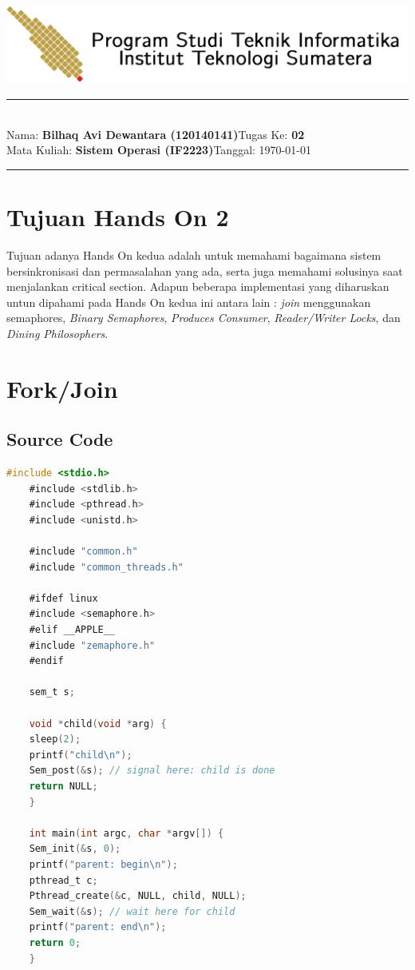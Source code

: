 \documentclass[11pt,a4paper]{article}
\newcommand{\stuid}{120140141}
\newcommand{\student}{\textbf{Bilhaq Avi Dewantara (\stuid{})}}
\newcommand{\course}{\textbf{Sistem Operasi (IF2223)}}
\newcommand{\assignment}{\textbf{02}} %
\begin{document}
\thispagestyle{empty}
\begin{center}
	\includegraphics[scale = 0.15]{Figure1/ifitera-header.png}
	\vspace{0.1cm}
\end{center}
\noindent
{\large
\rule{17cm}{0.2cm}\\[0.3cm]
Nama: \student \hfill Tugas Ke: \assignment\\[0.1cm]
Mata Kuliah: \course \hfill Tanggal: \today\\
\rule{17cm}{0.05cm}
\vspace{0.1cm}
}


\section{Tujuan Hands On 2}
    Tujuan adanya Hands On kedua adalah untuk memahami bagaimana sistem bersinkronisasi dan permasalahan yang ada, serta juga memahami solusinya saat menjalankan critical section.
	Adapun beberapa implementasi yang diharuskan untun dipahami pada Hands On kedua ini antara lain : \textit{join} menggunakan semaphores, \textit{Binary Semaphores}, 
	\textit{Produces Consumer}, \textit{Reader/Writer Locks}, dan \textit{Dining Philosophers}.


\section{Fork/Join}
\subsection{Source Code}
\begin{lstlisting}[language=C]
	#include <stdio.h>
	#include <stdlib.h>
	#include <pthread.h>
	#include <unistd.h>

	#include "common.h"
	#include "common_threads.h"

	#ifdef linux
	#include <semaphore.h>
	#elif __APPLE__
	#include "zemaphore.h"
	#endif

	sem_t s;

	void *child(void *arg) {
	sleep(2);
	printf("child\n");
	Sem_post(&s); // signal here: child is done
	return NULL;
	}

	int main(int argc, char *argv[]) {
	Sem_init(&s, 0); 
	printf("parent: begin\n");
	pthread_t c;
	Pthread_create(&c, NULL, child, NULL);
	Sem_wait(&s); // wait here for child
	printf("parent: end\n");
	return 0;
	}
	\end{lstlisting}
\end{document}
